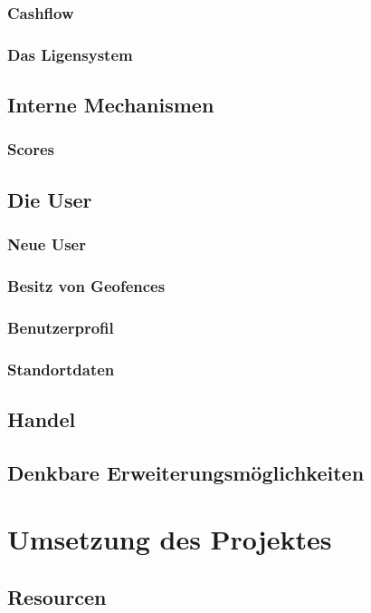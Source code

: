 \documentclass{scrreprt}
\begin{document}
\subsection{Cashflow}
\subsection{Das Ligensystem}

\section{Interne Mechanismen}
\subsection{Scores}


\section{Die User}
\subsection{Neue User}
\subsection{Besitz von Geofences}
\subsection{Benutzerprofil}
\subsection{Standortdaten}

\section{Handel}

\section{Denkbare Erweiterungsmöglichkeiten}

\chapter{Umsetzung des Projektes}
\section{Resourcen}
\end{document}
